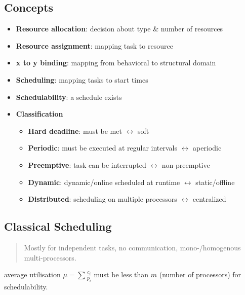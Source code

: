\documentclass{article}
\begin{document}
\subsection{Concepts}
\begin{itemize}
  \item \textbf{Resource allocation}: decision about type \& number of resources
  \item \textbf{Resource assignment}: mapping task to resource
  \item \textbf{x to y binding}: mapping from behavioral to structural domain
  \item \textbf{Scheduling}: mapping tasks to start times
  \item \textbf{Schedulability}: a schedule exists
  \item \textbf{Classification}

        \begin{itemize}
          \item \textbf{Hard deadline}: must be met $\leftrightarrow$ soft
          \item \textbf{Periodic}: must be executed at regular intervals $\leftrightarrow$ aperiodic
          \item \textbf{Preemptive}: task can be interrupted $\leftrightarrow$ non-preemptive
          \item \textbf{Dynamic}: dynamic/online scheduled at runtime $\leftrightarrow$ static/offline
          \item \textbf{Distributed}: scheduling on multiple processors $\leftrightarrow$ centralized
        \end{itemize}
\end{itemize}

\subsection{Classical Scheduling}
\begin{quote}Mostly for independent tasks, no communication, mono-/homogenous multi-processors.\end{quote}


average utilisation $\mu=\sum{\frac{c_i}{p_i}}$ must be less than $m$ (number of processors) for schedulability.
\end{document}
